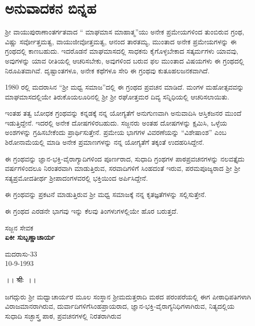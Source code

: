 
\chapter*{ಅನುವಾದಕನ ಬಿನ್ನಹ}

 ಶ‍್ರೀ ವಾಯುಪುರಾಣಾಂತರ್ಗತವಾದ “ ಮಾಘಮಾಸ ಮಾಹಾತ್ಮ”ಯು ಅನೇಕ ಪ್ರಮೇಯಗಳಿಂದ ತುಂಬಿರುವ ಗ್ರಂಥ, ವಿಷ್ಣು ಸರ್ವೋತ್ತಮತ್ವ, ವಾಯುಜೀವೋತ್ತಮತ್ವ, ಆನಂದ ತಾರತಮ್ಯ, ಮುಂತಾದ ಅನೇಕ ಪ್ರಮೇಯಗಳನ್ನು ಈ ಗ್ರಂಥದಲ್ಲಿ ಕಾಣಬಹುದು. ಇದರೊಡನೆ ಮಾಘಮಾಸದಲ್ಲಿ ಸಾಧಕನು ಕೈಗೊಳ್ಳಬೇಕಾದ ಸತ್ಕರ್ಮಗಳು ಯಾವವು, ಅವುಗಳನ್ನು ಯಾವ ರೀತಿಯಲ್ಲಿ ಆಚರಿಸಬೇಕು, ಅವುಗಳಿಂದ ಬರುವ ಫಲ ಮುಂತಾದ ವಿಷಯಗಳು ಈ ಗ್ರಂಥದಲ್ಲಿ ನಿರೂಪಿತವಾಗಿವೆ. ದೃಷ್ಟಾಂತಗಳೂ, ಅನೇಕ ಕಥೆಗಳೂ ಸೇರಿ ಈ ಗ್ರಂಥವು ಕುತೂಹಲಜನಕವಾಗಿದೆ.

1980 ರಲ್ಲಿ ಮದರಾಸಿನ “ಶ‍್ರೀ ಮಧ್ವ ಸಮಾಜ”ದಲ್ಲಿ ಈ ಗ್ರಂಥದ ಪ್ರವಚನ ಮಾಡಿದೆ. ಮಂಗಳ ಮಹೋತ್ಸವವನ್ನು ಮಾಘಮಾಸದಲ್ಲಿಯೇ ತಿರುಕೊಯಲೂರಿನಲ್ಲಿ ಶ‍್ರೀ ಶ‍್ರೀ ರಘೋತ್ತಮರ ದಿವ್ಯ ಸನ್ನಿಧಿಯಲ್ಲಿ ಆಚರಿಸಲಾಯಿತು.

ಇಂತಹ ತತ್ವ ಬೋಧಕ ಗ್ರಂಥವನ್ನು ಕನ್ನಡಕ್ಕೆ ನನ್ನ ಯೋಗ್ಯತೆಗೆ ಅನುಗುಣವಾಗಿ ಅನುವಾದಿಸಿ ಆಸ್ತಿಕಜನರ ಮುಂದೆ ಇಡುತ್ತಿದ್ದೇನೆ. ಇದರಲ್ಲಿ ಅನೇಕ ದೋಷಗಳಿರಬಹುದು. ಸಜ್ಜನರು ಅಂತಹ ದೋಷಗಳನ್ನು ಕ್ಷಮಿಸಿ, ಒಳ್ಳೆಯ ಅಂಶಗಳನ್ನು ಗ್ರಹಿಸಬೇಕೆಂದು ಪ್ರಾರ್ಥಿಸು\-ತ್ತೇನೆ. ಪ್ರಮೇಯ ಭಾಗಗಳ ವಿವರಣೆಯನ್ನು “ವಿಶೇಷಾಂಶ” ಎಂಬ ಶಿರೋನಾಮೆಯಲ್ಲಿ ಮಾಡಿ ಅನೇಕ ಪ್ರಮಾಣಗಳನ್ನು ನನ್ನ ಯೋಗ್ಯತೆಗೆ ತಕ್ಕಂತೆ ಉದಹರಿಸಿದ್ದೇನೆ.

ಈ ಗ್ರಂಥವನ್ನು ಜ್ಞಾನ-ಭಕ್ತಿ-ವೈರಾಗ್ಯಾದಿಗಳಿಂದ ಪೂರ್ಣರಾದ, ಸುಧಾದಿ ಗ್ರಂಥಗಳ ಪಾಠಪ್ರವಚನಗಳನ್ನು ನಲವತ್ತೈದು ವರ್ಷಗಳಿಂದಲೂ ನಿರಂತರವಾಗಿ ಮಾಡುತ್ತಿರುವ, ಸರವಾದಿಗಳಿಗೆ ಸಿಂಹದಂತೆ ಇರುವ, ಪರಮಪೂಜ್ಯರಾದ ಶ‍್ರೀ ಶ‍್ರೀ ಸತ್ಯಪ್ರಮೋದತೀರ್ಥ ಶ‍್ರೀಪಾದಂಗಳವರಲ್ಲಿ ಭಕ್ತಿಯಿಂದ ಅರ್ಪಿಸಿದ್ದೇನೆ.

\newpage

ಈ ಗ್ರಂಥವನ್ನು ಪ್ರಕಟನೆ ಮಾಡುತ್ತಿರುವ ಶ‍್ರೀ ಮಧ್ವ ಸಮಾಜಕ್ಕೆ ನನ್ನ ಕೃತಜ್ಞತೆಗಳನ್ನು ಸಲ್ಲಿಸುತ್ತೇನೆ.

ಈ ಗ್ರಂಥದ ಎರಡನೇ ಭಾಗವು ಇನ್ನು ಕೆಲವು ತಿಂಗಳುಗಳಲ್ಲಿಯೇ ಹೊರ ಬರುತ್ತದೆ.

\begin{flushright}
ಸಜ್ಜನ ಸೇವಕ \\\textbf{ ಏಕೀ ಸುಬ್ಬಣ್ಣಾಚಾರ್ಯ}
\end{flushright}

\begin{flushleft}
ಮದರಾಸು-33 \\ 10-9-1993
\end{flushleft}

\newpage

\begin{center}
।। श्रीः~।।
\end{center}

ಜಗದ್ಗುರು ಶ‍್ರೀ ಮಧ್ವಾಚಾರ್ಯರ ಮೂಲ ಸಂಸ್ಥಾನ ಶ‍್ರೀಮದುತ್ತರಾದಿ ಮಠದ ಪರಂಪರೆಯಲ್ಲಿ ಈಗ ಪೀಠಾಧಿಪತಿಗಳಾಗಿ ವಿರಾಜಮಾನರಾಗಿರುವ, ದುರ್ವಾದಿಗಳಿಗೆ\break ಸಿಂಹಪ್ರಾಯರಾದ, ಜ್ಞಾನ-ಭಕ್ತಿ-ವೈರಾಗ್ಯನಿಧಿಗಳಾಗಿರುವ, ನಿತ್ಯದಲ್ಲಿಯ ಸುಧಾದಿ ಸಚ್ಛಾಸ್ತ್ರ ಪಾಠ, ಪ್ರವಚನಗಳಲ್ಲಿ ನಿರತರಾಗಿರುವ

